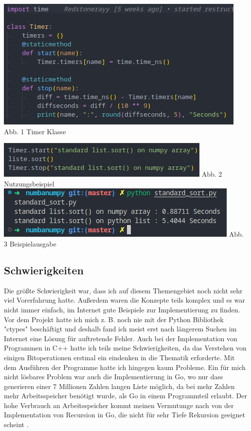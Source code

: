 \documentclass[12pt,a4paper]{article}
\begin{document}
\begin{multicols}{2}
    
    \begin{center}
        \includegraphics[width=.5\textwidth]{screenshots/pythontimer.png}
        Abb. 1 Timer Klasse
    \end{center}
    
    \columnbreak
    
    \begin{center}
        \includegraphics[width=.5\textwidth]{screenshots/timerexample.png}
        Abb. 2 Nutzungsbeispiel
        \includegraphics[width=.5\textwidth]{screenshots/outputexample.png}
        Abb. 3 Beispielausgabe
    \end{center}
    
\end{multicols}

\subsection{Schwierigkeiten}
Die größte Schwierigkeit war, dass ich auf diesem Themengebiet noch nicht sehr viel Vorerfahrung hatte.
Außerdem waren die Konzepte teils komplex und es war nicht immer einfach, im Internet gute Beispiele zur Implementierung
zu finden. Vor dem Projekt hatte ich mich z. B. noch nie mit der Python Bibliothek "ctypes" beschäftigt und deshalb fand
ich meist erst nach längerem Suchen im Internet eine Lösung für auftretende Fehler.
Auch bei der Implementation von Programmen in C++ hatte ich teils meine Schwierigkeiten, da das Verstehen
von einigen Bitoperationen erstmal ein eindenken in die Thematik erforderte.
Mit dem Ausführen der Programme hatte ich hingegen kaum Probleme.
Ein für mich nicht lösbares Problem war auch die Implementierung in Go, wo nur dass generieren
einer 7 Millionen Zahlen langen Liste möglich, da bei mehr Zahlen mehr Arbeitsspeicher benötigt wurde,
als Go in einem Programmteil erlaubt. Der hohe Verbrauch an Arbeitsspeicher kommt meinen Vermutunge
nach von der Implementation von Recursion in Go, die nicht für sehr Tiefe Rekursion geeignet scheint
\cite{godeeprecursions} \cite{goroutinesize}.
\end{document}
